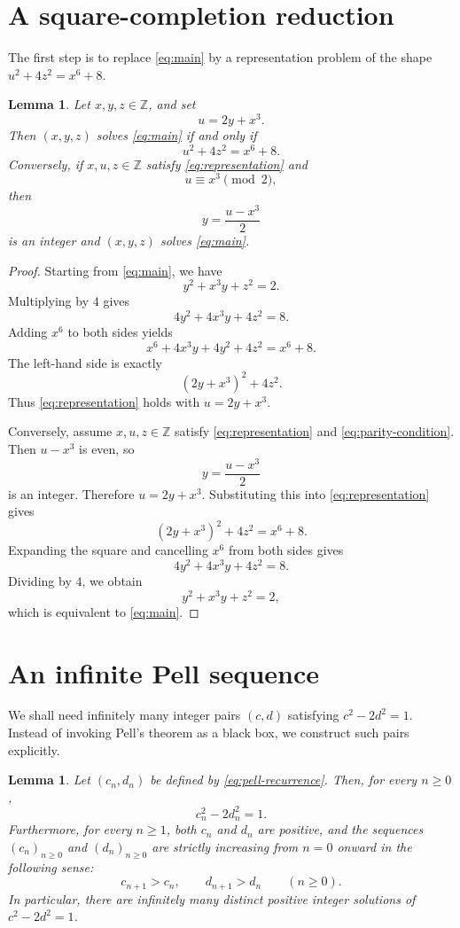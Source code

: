 \documentclass[11pt]{article}
\numberwithin{equation}{section}
\newtheorem{lemma}[theorem]{Lemma}
\theoremstyle{remark}
\begin{document}
\section{A square-completion reduction}

The first step is to replace \eqref{eq:main} by a representation problem of the shape \(u^2+4z^2=x^6+8\).

\begin{lemma}\label{lem:square-completion}
Let \(x,y,z\in\mathbb Z\), and set
\[
    u=2y+x^3.
\]
Then \((x,y,z)\) solves \eqref{eq:main} if and only if
\begin{equation}\label{eq:representation}
    u^2+4z^2=x^6+8.
\end{equation}
Conversely, if \(x,u,z\in\mathbb Z\) satisfy \eqref{eq:representation} and
\begin{equation}\label{eq:parity-condition}
    u\equiv x^3\pmod 2,
\end{equation}
then
\[
    y=\frac{u-x^3}{2}
\]
is an integer and \((x,y,z)\) solves \eqref{eq:main}.
\end{lemma}

\begin{proof}
Starting from \eqref{eq:main}, we have
\[
    y^2+x^3y+z^2=2.
\]
Multiplying by \(4\) gives
\[
    4y^2+4x^3y+4z^2=8.
\]
Adding \(x^6\) to both sides yields
\[
    x^6+4x^3y+4y^2+4z^2=x^6+8.
\]
The left-hand side is exactly
\[
    (2y+x^3)^2+4z^2.
\]
Thus \eqref{eq:representation} holds with \(u=2y+x^3\).

Conversely, assume \(x,u,z\in\mathbb Z\) satisfy \eqref{eq:representation} and \eqref{eq:parity-condition}.  Then \(u-x^3\) is even, so
\[
    y=\frac{u-x^3}{2}
\]
is an integer.  Therefore \(u=2y+x^3\).  Substituting this into \eqref{eq:representation} gives
\[
    (2y+x^3)^2+4z^2=x^6+8.
\]
Expanding the square and cancelling \(x^6\) from both sides gives
\[
    4y^2+4x^3y+4z^2=8.
\]
Dividing by \(4\), we obtain
\[
    y^2+x^3y+z^2=2,
\]
which is equivalent to \eqref{eq:main}.
\end{proof}

\section{An infinite Pell sequence}

We shall need infinitely many integer pairs \((c,d)\) satisfying \(c^2-2d^2=1\).  Instead of invoking Pell's theorem as a black box, we construct such pairs explicitly.

\begin{lemma}\label{lem:pell-sequence}
Let \((c_n,d_n)\) be defined by \eqref{eq:pell-recurrence}.  Then, for every \(n\ge 0\),
\begin{equation}\label{eq:pell}
    c_n^2-2d_n^2=1.
\end{equation}
Furthermore, for every \(n\ge 1\), both \(c_n\) and \(d_n\) are positive, and the sequences \((c_n)_{n\ge 0}\) and \((d_n)_{n\ge 0}\) are strictly increasing from \(n=0\) onward in the following sense:
\[
    c_{n+1}>c_n,
    \qquad
    d_{n+1}>d_n
    \qquad(n\ge 0).
\]
In particular, there are infinitely many distinct positive integer solutions of \(c^2-2d^2=1\).
\end{lemma}
\end{document}
